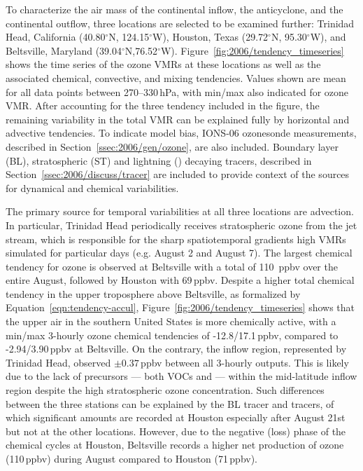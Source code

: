 To characterize the air mass of the continental inflow, the anticyclone, and the continental outflow, three locations are selected to be
examined further: Trinidad Head, California (40.80$^\circ$N, 124.15$^\circ$W), Houston, Texas (29.72$^\circ$N, 95.30$^\circ$W),
and Beltsville, Maryland (39.04$^\circ$N,76.52$^\circ$W). Figure~\ref{fig:2006/tendency_timeseries} shows the time series of the
ozone VMRs at these locations as well as the associated chemical, convective, and mixing tendencies. Values shown are mean for
all data points between 270--330\,\unit{hPa}, with min/max also indicated for ozone VMR. After accounting for the three tendency
included in the figure, the remaining variability in the total VMR can be explained fully by horizontal and advective tendencies.
To indicate model bias, IONS-06 ozonesonde measurements, described in Section~\ref{ssec:2006/gen/ozone}, are also included.
Boundary layer (BL), stratospheric (ST) and lightning (\lnox) decaying tracers, described in Section~\ref{ssec:2006/discuss/tracer}
are included to provide context of the sources for dynamical and chemical variabilities.

The primary source for temporal variabilities at all three locations are advection. In particular, Trinidad Head periodically receives
stratospheric ozone from the jet stream, which is responsible for the sharp spatiotemporal gradients high VMRs simulated for particular
days (e.g. August 2 and August 7). The largest chemical tendency for ozone is observed at Beltsville with a total of 110 \,\unit{ppbv}
over the entire August, followed by Houston with 69\,\unit{ppbv}. Despite a higher total chemical tendency in the upper troposphere above
Beltsville, as formalized by Equation~\ref{eqn:tendency-accul}, Figure~\ref{fig:2006/tendency_timeseries} shows that the upper air
in the southern United States is more chemically active, with a min/max 3-hourly ozone chemical tendencies of -12.8/17.1\,\unit{ppbv},
compared to -2.94/3.90\,\unit{ppbv} at Beltsville. On the contrary, the inflow region, represented by Trinidad Head, observed $\pm0.37$\,\unit{ppbv}
between all 3-hourly outputs. This is likely due to the lack of precursors --- both VOCs and  --- within the mid-latitude inflow
region despite the high stratospheric ozone concentration. Such differences between the three stations can be explained by the BL tracer
and {\lnox} tracers, of which significant amounts are recorded at Houston especially after August 21st but not at the other locations. However,
due to the negative (loss) phase of the chemical cycles at Houston, Beltsville records a higher net production of ozone (110\,\unit{ppbv})
during August compared to Houston (71\,\unit{ppbv}).

